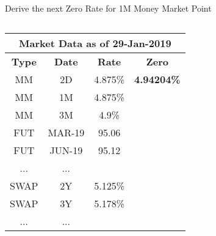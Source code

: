 \documentclass[handout, aspectratio=169]{beamer}
\begin{document}
\begin{frame}{Derive the next Zero Rate for 1M Money Market Point}
	\begin{columns}[T]
		\begin{column}{0.4\textwidth}
			\begin{table}[t]
				\centering
				\begin{adjustbox}{max width=\textwidth, max height=\textheight}
					\begin{tabular}{|c|c|c|c|} 
						\hline
						\multicolumn{4}{|c|}{\textbf{Market Data as of 29-Jan-2019}} \\
						\hline
						\textbf{Type} & \textbf{Date}  & \textbf{Rate} & \textbf{Zero}\\				
						\hline
						MM & 2D & 4.875\% & \textbf{4.94204\%} \\
						MM & 1M & 4.875\% &\\
						MM & 3M & 4.9\% &\\
						\hline
						FUT & MAR-19 & 95.06 &\\
						FUT & JUN-19 & 95.12 &\\
						... & ... & &\\
						\hline
						SWAP & 2Y & 5.125\% &\\
						SWAP & 3Y & 5.178\% &\\
						... & ... & &\\
						\hline
					\end{tabular}
				\end{adjustbox}
			\end{table}
		\end{column}
		

\end{columns}
\end{frame}
\end{document}
